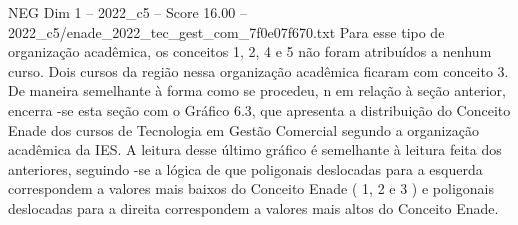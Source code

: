 \begin{textsample}{NEG Dim 1 – 2022\_c5 – Score 16.00 – 2022\_c5/enade\_2022\_tec\_gest\_com\_7f0e07f670.txt}
Para esse tipo de organização acadêmica, os conceitos 1, 2, 4 e 5 não foram atribuídos a nenhum curso.
Dois cursos da região nessa organização acadêmica ficaram com conceito 3.
De maneira semelhante à forma como se procedeu, n em relação à seção anterior, encerra -se esta seção com o Gráfico 6.3, que apresenta a distribuição do Conceito Enade dos cursos de Tecnologia em Gestão Comercial segundo a organização acadêmica da IES.
A leitura desse último gráfico é semelhante à leitura feita dos anteriores, seguindo -se a lógica de que poligonais deslocadas para a esquerda correspondem a valores mais baixos do Conceito Enade ( 1, 2 e 3 ) e poligonais deslocadas para a direita correspondem a valores mais altos do Conceito Enade.

\end{textsample}
